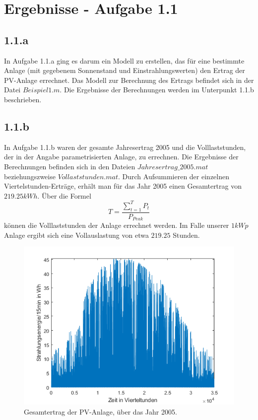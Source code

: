 \documentclass[a4paper,12pt]{article}
\begin{document}
	\section{Ergebnisse - Aufgabe 1.1}
	\subsection{1.1.a}
	In Aufgabe 1.1.a ging es darum ein Modell zu erstellen, das für eine bestimmte Anlage (mit gegebenem Sonnenstand und Einstrahlungswerten) den Ertrag der PV-Anlage errechnet.\newline
	Das Modell zur Berechnung des Ertrags befindet sich in der Datei $Beispiel1.m$. Die Ergebnisse der Berechnungen werden im Unterpunkt 1.1.b beschrieben.
	\subsection{1.1.b}
	In Aufgabe 1.1.b waren der gesamte Jahresertrag 2005 und die Volllaststunden, der in der Angabe parametrisierten Anlage, zu errechnen.\newline
	Die Ergebnisse der Berechnungen befinden sich in den Dateien $Jahresertrag\_2005.mat$ beziehungszweise $Vollaststunden.mat$.\newline
	Durch Aufsummieren der einzelnen Viertelstunden-Erträge, erhält man für das Jahr 2005 einen Gesamtertrag von $219.25kWh$.\newline
	Über die Formel
	\begin{equation}
	T=\frac{\sum \limits_{t=1}^T P_t}{P_{Peak}}
	\end{equation}
	können die Volllaststunden der Anlage errechnet werden. Im Falle unserer $1kWp$ Anlage ergibt sich eine Vollauslastung von etwa $219.25$ Stunden.
	\begin{figure}[H]
		\centering
		\includegraphics[width=12cm]{img/results/Gesamtertrag}
		\caption{Gesamtertrag der PV-Anlage, über das Jahr 2005.}
	\end{figure}
\end{document}
